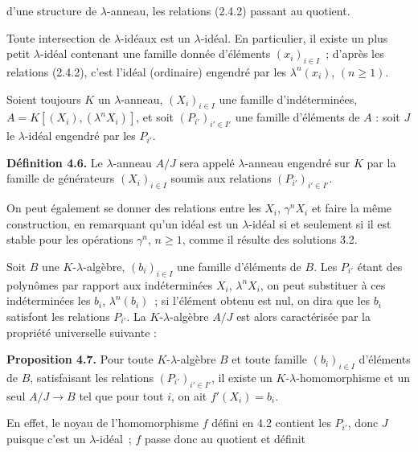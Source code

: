 d'une
structure de \(\lambda\)-anneau, les relations (2.4.2) passant au quotient.

Toute intersection de \(\lambda\)-idéaux est un \(\lambda\)-idéal. En particulier, il existe un plus petit \(\lambda\)-idéal contenant une famille donnée d'éléments \((x_i)_{i\in I}\)~; d'après les relations (2.4.2), c'est l'idéal (ordinaire) engendré par les \(\lambda^n(x_i)\), \((n\ge1)\).

Soient toujours \(K\) un \(\lambda\)-anneau, \((X_i)_{i\in I}\) une famille d'indéterminées, \(A=K[(X_i),(\lambda^n X_i)]\), et soit \((P_{i'})_{i'\in I'}\) une famille d'éléments de \(A\) : soit \(J\) le \(\lambda\)-idéal engendré par les \(P_{i'}\).

\textbf{Définition 4.6.} Le \(\lambda\)-anneau \(A/J\) sera appelé \(\lambda\)-anneau engendré sur \(K\) par la famille de générateurs \((X_i)_{i\in I}\) soumis aux relations \((P_{i'})_{i'\in I'}\).

On peut également se donner des relations entre les \(X_i\), \(\gamma^n X_i\) et faire la même construction, en remarquant qu'un idéal est un \(\lambda\)-idéal si et seulement si il est stable pour les opérations \(\gamma^n\), \(n\ge1\), comme il résulte des solutions 3.2.

Soit \(B\) une \(K\)-\(\lambda\)-algèbre, \((b_i)_{i\in I}\) une famille d'éléments de \(B\). Les \(P_{i'}\) étant des polynômes par rapport aux indéterminées \(X_i\), \(\lambda^n X_i\), on peut substituer à ces indéterminées les \(b_i\), \(\lambda^n(b_i)\)~; si l'élément obtenu est nul, on dira que les \(b_i\) satisfont les relations \(P_{i'}\). La \(K\)-\(\lambda\)-algèbre \(A/J\) est alors caractérisée par la propriété universelle suivante :

\textbf{Proposition 4.7.} Pour toute \(K\)-\(\lambda\)-algèbre \(B\) et toute famille \((b_i)_{i\in I}\) d'éléments de \(B\), satisfaisant les relations \((P_{i'})_{i'\in I'}\), il existe un \(K\)-\(\lambda\)-homomorphisme et un seul \(A/J\to B\) tel que pour tout \(i\), on ait \(f'(X_i)=b_i\).

En effet, le noyau de l'homomorphisme \(f\) défini en 4.2 contient les \(P_{i'}\), donc \(J\) puisque c'est un \(\lambda\)-idéal~; \(f\) passe donc au quotient et définit 
